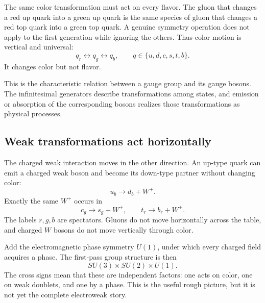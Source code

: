 The same color transformation must act on every flavor. The gluon that
changes a red up quark into a green up quark is the same species of gluon that
changes a red top quark into a green top quark. A genuine symmetry operation
does not apply to the first generation while ignoring the others. Thus color
motion is vertical and universal:
\begin{equation}
  q_r\longleftrightarrow q_g\longleftrightarrow q_b,
  \qquad q\in\{u,d,c,s,t,b\}.
\end{equation}
It changes color but not flavor.

This is the characteristic relation between a gauge group and its gauge
bosons. The infinitesimal generators describe transformations among states,
and emission or absorption of the corresponding bosons realizes those
transformations as physical processes.

\subsection{Weak transformations act horizontally}

The charged weak interaction moves in the other direction. An up-type quark
can emit a charged weak boson and become its down-type partner without
changing color:
\begin{equation}
  u_b\longrightarrow d_b+W^+.
\end{equation}
Exactly the same \(W^+\) occurs in
\begin{equation}
  c_g\longrightarrow s_g+W^+,
  \qquad
  t_r\longrightarrow b_r+W^+.
\end{equation}
The labels \(r,g,b\) are spectators. Gluons do not move horizontally across
the table, and charged \(W\) bosons do not move vertically through color.

Add the electromagnetic phase symmetry \(U(1)\), under which every charged
field acquires a phase. The first-pass group structure is then
\begin{equation}
  SU(3)\times SU(2)\times U(1).
\end{equation}
The cross signs mean that these are independent factors: one acts on color,
one on weak doublets, and one by a phase. This is the useful rough picture,
but it is not yet the complete electroweak story.


